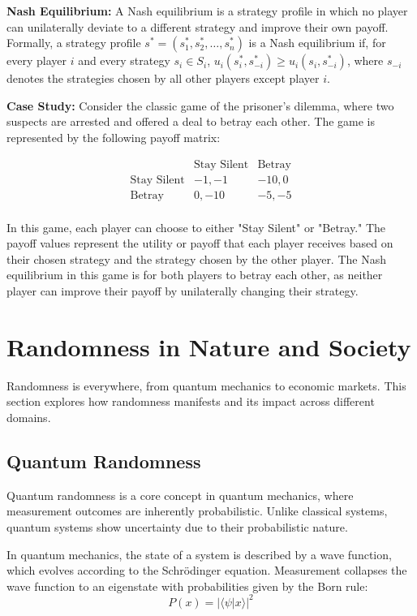 \documentclass[12pt]{book} %
\begin{document}
\textbf{Nash Equilibrium:} A Nash equilibrium is a strategy profile in which no player can unilaterally deviate to a different strategy and improve their own payoff. Formally, a strategy profile \(s^* = (s_1^*, s_2^*, \dots, s_n^*)\) is a Nash equilibrium if, for every player \(i\) and every strategy \(s_i \in S_i\), \(u_i(s_i^*, s_{-i}^*) \geq u_i(s_i, s_{-i}^*)\), where \(s_{-i}\) denotes the strategies chosen by all other players except player \(i\).

\textbf{Case Study:} Consider the classic game of the prisoner's dilemma, where two suspects are arrested and offered a deal to betray each other. The game is represented by the following payoff matrix:

\[
\begin{array}{c|cc}
 & \text{Stay Silent} & \text{Betray} \\
\hline
\text{Stay Silent} & -1, -1 & -10, 0 \\
\text{Betray} & 0, -10 & -5, -5 \\
\end{array}
\]

In this game, each player can choose to either "Stay Silent" or "Betray." The payoff values represent the utility or payoff that each player receives based on their chosen strategy and the strategy chosen by the other player. The Nash equilibrium in this game is for both players to betray each other, as neither player can improve their payoff by unilaterally changing their strategy.


\section{Randomness in Nature and Society}
Randomness is everywhere, from quantum mechanics to economic markets. This section explores how randomness manifests and its impact across different domains.

\subsection{Quantum Randomness}
Quantum randomness is a core concept in quantum mechanics, where measurement outcomes are inherently probabilistic. Unlike classical systems, quantum systems show uncertainty due to their probabilistic nature.

In quantum mechanics, the state of a system is described by a wave function, which evolves according to the Schrödinger equation. Measurement collapses the wave function to an eigenstate with probabilities given by the Born rule:
\[ P(x) = |\langle \psi | x \rangle |^2 \]
\end{document}
